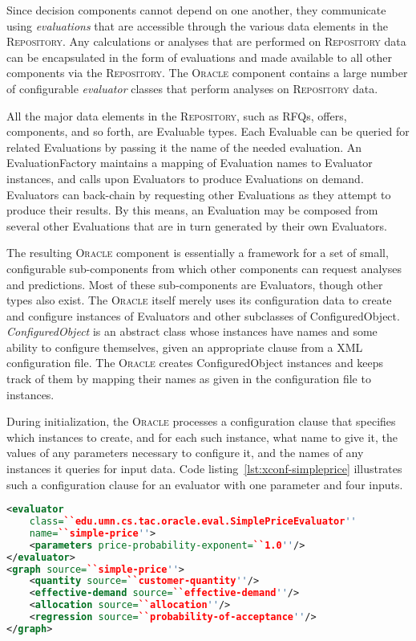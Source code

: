 \documentclass{article}
\begin{document}

Since decision components cannot depend on one another, they communicate
using \emph{evaluations} that are accessible through the various data
elements in the \textsc{Repository}.  Any calculations or analyses that
are performed on \textsc{Repository} data can be encapsulated in the
form of evaluations and made available to all other components via the
\textsc{Repository}.  The \textsc{Oracle} component contains a large
number of configurable \emph{evaluator} classes that perform analyses
on \textsc{Repository} data.

All the major data elements in the \textsc{Repository}, such as RFQs,
offers, components, and so forth, are Evaluable types.  Each Evaluable can
be queried for related Evaluations by passing it the name of the needed
evaluation.  An EvaluationFactory maintains a mapping of Evaluation
names to Evaluator instances, and calls upon Evaluators to produce
Evaluations on demand.  Evaluators can back-chain by requesting other
Evaluations as they attempt to produce their results.  By this means,
an Evaluation may be composed from several other Evaluations that are
in turn generated by their own Evaluators.

The resulting \textsc{Oracle} component is essentially a framework for
a set of small, configurable sub-components from which other components
can request analyses and predictions.  Most of these sub-components
are Evaluators, though other types also exist.  The \textsc{Oracle}
itself merely uses its configuration data to create and configure
instances of Evaluators and other subclasses of ConfiguredObject.
\emph{ConfiguredObject} is an abstract class whose instances have names
and some ability to configure themselves, given an appropriate clause from
a XML configuration file.  The \textsc{Oracle} creates ConfiguredObject
instances and keeps track of them by mapping their names as given in
the configuration file to instances.


During initialization, the \textsc{Oracle} processes a configuration
clause that specifies which instances to create, and for each such
instance, what name to give it, the values of any parameters necessary to
configure it, and the names of any instances it queries for input data.
Code listing~\ref{lst:xconf-simpleprice} illustrates such a configuration
clause for an evaluator with one parameter and four inputs.

{\small
\begin{lstlisting}[language={XML},frame={single},
label={lst:xconf-simpleprice},caption={Configuration clause for a price
evaluator that uses one parameter and several inputs}]
<evaluator
    class=``edu.umn.cs.tac.oracle.eval.SimplePriceEvaluator''
    name=``simple-price''>
    <parameters price-probability-exponent=``1.0''/>
</evaluator>
<graph source=``simple-price''>
    <quantity source=``customer-quantity''/>
    <effective-demand source=``effective-demand''/>
    <allocation source=``allocation''/>
    <regression source=``probability-of-acceptance''/>
</graph>
\end{lstlisting}
}
\end{document}
